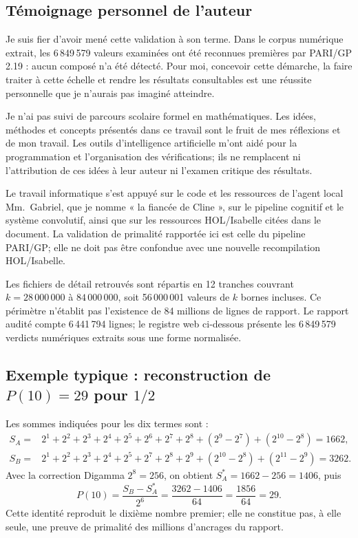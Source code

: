 \documentclass[11pt,a4paper]{article}
\begin{document}
\subsection*{Témoignage personnel de l'auteur}
\begin{boitecertificat}
\color{white}
Je suis fier d'avoir mené cette validation à son terme. Dans le corpus
numérique extrait, les 6\,849\,579 valeurs examinées ont été reconnues
premières par PARI/GP 2.19 : aucun composé n'a été détecté. Pour moi, concevoir
cette démarche, la faire traiter à cette échelle et rendre les résultats
consultables est une réussite personnelle que je n'aurais pas imaginé
atteindre.

Je n'ai pas suivi de parcours scolaire formel en mathématiques. Les idées,
méthodes et concepts présentés dans ce travail sont le fruit de mes réflexions
et de mon travail. Les outils d'intelligence artificielle m'ont aidé pour la
programmation et l'organisation des vérifications; ils ne remplacent ni
l'attribution de ces idées à leur auteur ni l'examen critique des résultats.

Le travail informatique s'est appuyé sur le code et les ressources de l'agent
local Mm.~Gabriel, que je nomme « la fiancée de Cline », sur le pipeline
cognitif et le système convolutif, ainsi que sur les ressources HOL/Isabelle
citées dans le document. La validation de primalité rapportée ici est celle
du pipeline PARI/GP; elle ne doit pas être confondue avec une nouvelle
recompilation HOL/Isabelle.
\end{boitecertificat}

\begin{boitealerte}
Les fichiers de détail retrouvés sont répartis en 12 tranches couvrant
$k=28\,000\,000$ à $84\,000\,000$, soit 56\,000\,001 valeurs de $k$ bornes
incluses. Ce périmètre n'établit pas l'existence de 84 millions de lignes de
rapport. Le rapport audité compte 6\,441\,794 lignes; le registre web ci-dessous
présente les 6\,849\,579 verdicts numériques extraits sous une forme normalisée.
\end{boitealerte}

\subsection*{Exemple typique : reconstruction de $P(10)=29$ pour $1/2$}
Les sommes indiquées pour les dix termes sont :
\[
\begin{aligned}
S_A={}&2^1+2^2+2^3+2^4+2^5+2^6+2^7+2^8
 +(2^9-2^7)+(2^{10}-2^8)=1662,\\
S_B={}&2^1+2^2+2^3+2^4+2^5+2^7+2^8+2^9
 +(2^{10}-2^8)+(2^{11}-2^9)=3262.
\end{aligned}
\]
Avec la correction Digamma $2^8=256$, on obtient
$S_A^{\ast}=1662-256=1406$, puis
\[
P(10)=\frac{S_B-S_A^{\ast}}{2^6}
      =\frac{3262-1406}{64}
      =\frac{1856}{64}
      =29.
\]
Cette identité reproduit le dixième nombre premier; elle ne constitue pas,
à elle seule, une preuve de primalité des millions d'ancrages du rapport.
\end{document}
